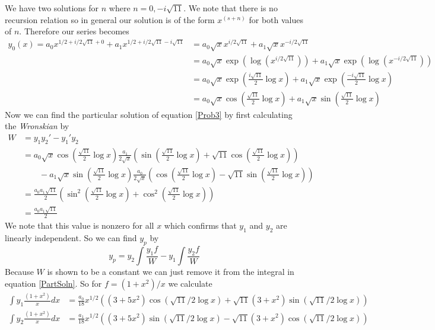 \documentclass[11pt]{article}
\numberwithin{equation}{section}
\begin{document}
We have two solutions for $n$ where $n=0,-i\sqrt{11}$. We note that there is no recursion 
relation so in general our solution is of the form $x^(s+n)$ for both values of $n$. 
Therefore our series becomes
\begin{align*}
y_0(x) = a_0x^{1/2+i/2\sqrt{11}+0} + a_1x^{1/2+i/2\sqrt{11}-i\sqrt{11}}&= a_0\sqrt{x}x^{i/2\sqrt{11}} + a_1\sqrt{x}x^{-i/2\sqrt{11}}\\
&= a_0\sqrt{x}\exp\left(\log(x^{i/2\sqrt{11}})\right) + a_1\sqrt{x}\exp\left(\log(x^{-i/2\sqrt{11}})\right)\\
&= a_0\sqrt{x}\exp\left(\frac{i\sqrt{11}}{2}\log x\right) + a_1\sqrt{x}\exp\left(\frac{-i\sqrt{11}}{2}\log x\right)\\
&= a_0\sqrt{x}\cos\left(\frac{\sqrt{11}}{2}\log x\right) + a_1\sqrt{x}\sin\left(\frac{\sqrt{11}}{2}\log x\right)
\end{align*}
Now we can find the particular solution of equation \ref{Prob3} by first calculating the
\emph{Wronskian} by
\begin{align*}
W &= y_1y_2' - y_1'y_2\\
&= a_0\sqrt{x}\cos\left(\frac{\sqrt{11}}{2}\log x\right)\frac{a_1}{2\sqrt{x}}\left(\sin\left(\frac{\sqrt{11}}{2}\log x\right) + \sqrt{11}\cos\left(\frac{\sqrt{11}}{2}\log x\right)\right) \\
&\qquad - a_1\sqrt{x}\sin\left(\frac{\sqrt{11}}{2}\log x\right)\frac{a_0}{2\sqrt{x}}\left(\cos\left(\frac{\sqrt{11}}{2}\log x\right) - \sqrt{11}\sin\left(\frac{\sqrt{11}}{2}\log x\right)\right)\\
&= \frac{a_0a_1\sqrt{11}}{2}\left(\sin^2\left(\frac{\sqrt{11}}{2}\log x\right) + \cos^2\left(\frac{\sqrt{11}}{2}\log x\right)\right)\\
&= \frac{a_0a_1\sqrt{11}}{2}
\end{align*}
We note that this value is nonzero for all $x$ which confirms that $y_1$ and $y_2$ are 
linearly independent. So we can find $y_p$ by
\begin{equation}
y_p = y_2\int\frac{y_1f}{W} - y_1\int\frac{y_2f}{W}
\label{PartSoln}
\end{equation}
Because $W$ is shown to be a constant we can just remove it from the integral in equation
\ref{PartSoln}. So for $f=(1+x^2)/x$ we calculate
\begin{align*}
\int y_1\frac{(1+x^2)}{x}dx &= \frac{a_0}{18}x^{1/2}\left((3+5x^2)\cos(\sqrt{11}/2\log x) + \sqrt{11}(3+x^2)\sin(\sqrt{11}/2\log x)\right)\\
\int y_2\frac{(1+x^2)}{x}dx &= \frac{a_1}{18}x^{1/2}\left((3+5x^2)\sin(\sqrt{11}/2\log x) - \sqrt{11}(3+x^2)\cos(\sqrt{11}/2\log x)\right)
\end{align*}
\end{document}
